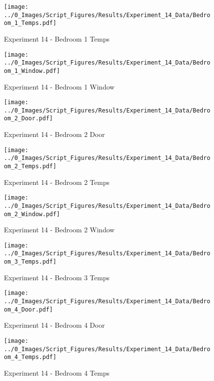 	\begin{figure}[H]
		\centering
		\texttt{[image: ../0\_Images/Script\_Figures/Results/Experiment\_14\_Data/Bedroom\_1\_Temps.pdf]}
		\caption[]{Experiment 14 - Bedroom 1 Temps}
	\end{figure}
 
	\clearpage

	\begin{figure}[H]
		\centering
		\texttt{[image: ../0\_Images/Script\_Figures/Results/Experiment\_14\_Data/Bedroom\_1\_Window.pdf]}
		\caption[]{Experiment 14 - Bedroom 1 Window}
	\end{figure}
 

	\begin{figure}[H]
		\centering
		\texttt{[image: ../0\_Images/Script\_Figures/Results/Experiment\_14\_Data/Bedroom\_2\_Door.pdf]}
		\caption[]{Experiment 14 - Bedroom 2 Door}
	\end{figure}
 
	\clearpage

	\begin{figure}[H]
		\centering
		\texttt{[image: ../0\_Images/Script\_Figures/Results/Experiment\_14\_Data/Bedroom\_2\_Temps.pdf]}
		\caption[]{Experiment 14 - Bedroom 2 Temps}
	\end{figure}
 

	\begin{figure}[H]
		\centering
		\texttt{[image: ../0\_Images/Script\_Figures/Results/Experiment\_14\_Data/Bedroom\_2\_Window.pdf]}
		\caption[]{Experiment 14 - Bedroom 2 Window}
	\end{figure}
 
	\clearpage

	\begin{figure}[H]
		\centering
		\texttt{[image: ../0\_Images/Script\_Figures/Results/Experiment\_14\_Data/Bedroom\_3\_Temps.pdf]}
		\caption[]{Experiment 14 - Bedroom 3 Temps}
	\end{figure}
 

	\begin{figure}[H]
		\centering
		\texttt{[image: ../0\_Images/Script\_Figures/Results/Experiment\_14\_Data/Bedroom\_4\_Door.pdf]}
		\caption[]{Experiment 14 - Bedroom 4 Door}
	\end{figure}
 
	\clearpage

	\begin{figure}[H]
		\centering
		\texttt{[image: ../0\_Images/Script\_Figures/Results/Experiment\_14\_Data/Bedroom\_4\_Temps.pdf]}
		\caption[]{Experiment 14 - Bedroom 4 Temps}
	\end{figure}
 

